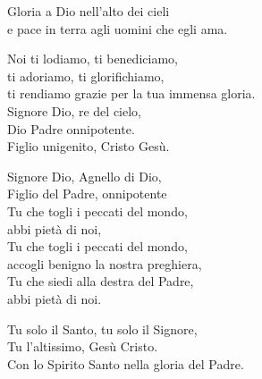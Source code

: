 \documentclass[11pt]{book}
\begin{document}
\introduzione

\membatt

\vspace{-0.5\baselineskip}
\settowidth{\versewidth}{ti rendiamo grazie per la tua immensa gloria.}
\begin{canzone}%
\begin{ritornello}
Gloria a Dio nell'alto dei cieli\\
e pace in terra agli uomini che egli ama.
\end{ritornello}

Noi ti lodiamo, ti benediciamo,\\
ti adoriamo, ti glorifichiamo,\\
ti rendiamo grazie per la tua immensa gloria.\\
Signore Dio, re del cielo,\\
Dio Padre onnipotente.\\
Figlio unigenito, Cristo Gesù.

Signore Dio, Agnello di Dio,\\
Figlio del Padre, onnipotente\\
Tu che togli i peccati del mondo,\\
abbi pietà di noi,\\
Tu che togli i peccati del mondo,\\
accogli benigno la nostra preghiera,\\
Tu che siedi alla destra del Padre,\\
abbi pietà di noi.

Tu solo il Santo, tu solo il Signore,\\
Tu l'altissimo, Gesù Cristo.\\
Con lo Spirito Santo nella gloria del Padre.
\end{canzone}
\end{document}
